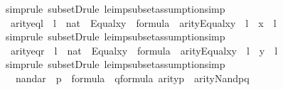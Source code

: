 \begin{isabellebody}
\endisadelimproof
%
\isatagproof
{}\isamarkupfalse%
{\isacharparenleft}{\kern0pt}simp{\isacharcomma}{\kern0pt}rule\ subsetD{\isacharcomma}{\kern0pt}rule\ le{\isacharunderscore}{\kern0pt}imp{\isacharunderscore}{\kern0pt}subset{\isacharcomma}{\kern0pt}assumption{\isacharcomma}{\kern0pt}simp{\isacharparenright}{\kern0pt}%
\endisatagproof
{\isafoldproof}%
%
\isadelimproof
\isanewline
%
\endisadelimproof
{}\isamarkupfalse%
\ arity{\isacharunderscore}{\kern0pt}eql\ {\isacharcolon}{\kern0pt}\ {\isachardoublequoteopen}l\ {\isasymin}\ nat\ {\isasymLongrightarrow}\ Equal{\isacharparenleft}{\kern0pt}x{\isacharcomma}{\kern0pt}y{\isacharparenright}{\kern0pt}\ {\isasymin}\ formula\ {\isasymLongrightarrow}\ arity{\isacharparenleft}{\kern0pt}Equal{\isacharparenleft}{\kern0pt}x{\isacharcomma}{\kern0pt}y{\isacharparenright}{\kern0pt}{\isacharparenright}{\kern0pt}\ {\isasymle}\ l\ {\isasymLongrightarrow}\ x\ {\isasymin}\ l{\isachardoublequoteclose}\isanewline
%
\isadelimproof
\ \ %
\endisadelimproof
%
\isatagproof
{}\isamarkupfalse%
{\isacharparenleft}{\kern0pt}simp{\isacharcomma}{\kern0pt}rule\ subsetD{\isacharcomma}{\kern0pt}rule\ le{\isacharunderscore}{\kern0pt}imp{\isacharunderscore}{\kern0pt}subset{\isacharcomma}{\kern0pt}assumption{\isacharcomma}{\kern0pt}simp{\isacharparenright}{\kern0pt}%
\endisatagproof
{\isafoldproof}%
%
\isadelimproof
\isanewline
%
\endisadelimproof
{}\isamarkupfalse%
\ arity{\isacharunderscore}{\kern0pt}eqr\ {\isacharcolon}{\kern0pt}\ {\isachardoublequoteopen}l\ {\isasymin}\ nat\ {\isasymLongrightarrow}\ Equal{\isacharparenleft}{\kern0pt}x{\isacharcomma}{\kern0pt}y{\isacharparenright}{\kern0pt}\ {\isasymin}\ formula\ {\isasymLongrightarrow}\ arity{\isacharparenleft}{\kern0pt}Equal{\isacharparenleft}{\kern0pt}x{\isacharcomma}{\kern0pt}y{\isacharparenright}{\kern0pt}{\isacharparenright}{\kern0pt}\ {\isasymle}\ l\ {\isasymLongrightarrow}\ y\ {\isasymin}\ l{\isachardoublequoteclose}\isanewline
%
\isadelimproof
\ \ %
\endisadelimproof
%
\isatagproof
{}\isamarkupfalse%
{\isacharparenleft}{\kern0pt}simp{\isacharcomma}{\kern0pt}rule\ subsetD{\isacharcomma}{\kern0pt}rule\ le{\isacharunderscore}{\kern0pt}imp{\isacharunderscore}{\kern0pt}subset{\isacharcomma}{\kern0pt}assumption{\isacharcomma}{\kern0pt}simp{\isacharparenright}{\kern0pt}%
\endisatagproof
{\isafoldproof}%
%
\isadelimproof
\isanewline
%
\endisadelimproof
{}\isamarkupfalse%
\ \ nand{\isacharunderscore}{\kern0pt}ar{}\ {\isacharcolon}{\kern0pt}\ {\isachardoublequoteopen}p\ {\isasymin}\ formula\ {\isasymLongrightarrow}\ q{\isasymin}formula\ {\isasymLongrightarrow}arity{\isacharparenleft}{\kern0pt}p{\isacharparenright}{\kern0pt}\ {\isasymle}\ arity{\isacharparenleft}{\kern0pt}Nand{\isacharparenleft}{\kern0pt}p{\isacharcomma}{\kern0pt}q{\isacharparenright}{\kern0pt}{\isacharparenright}{\kern0pt}{\isachardoublequoteclose}\isanewline

\end{isabellebody}
